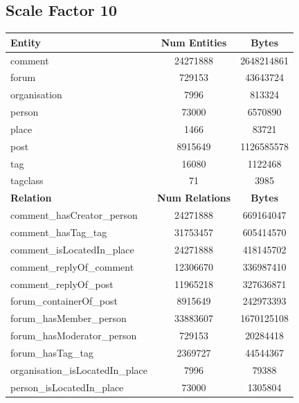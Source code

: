\subsection{Scale Factor 10}
\begin{table}[H]
    \centering
    \begin{tabular} {| l | c | c |}
        \hline
        \textbf{Entity} & \textbf{Num Entities} & \textbf{Bytes} \\
        \hline
        \hline
        comment & 24271888 & 2648214861 \\
        \hline
        forum & 729153 & 43643724 \\
        \hline
        organisation & 7996 & 813324 \\
        \hline
        person & 73000 & 6570890 \\
        \hline
        place & 1466 & 83721 \\
        \hline
        post & 8915649 & 1126585578 \\
        \hline
        tag & 16080 & 1122468 \\
        \hline
        tagclass & 71 & 3985 \\
        \hline
        \hline
        \textbf{Relation} & \textbf{Num Relations} & \textbf{Bytes} \\
        \hline
        \hline
        comment\_hasCreator\_person & 24271888 & 669164047 \\
        \hline
        comment\_hasTag\_tag & 31753457 & 605414570 \\
        \hline
        comment\_isLocatedIn\_place & 24271888 & 418145702 \\
        \hline
        comment\_replyOf\_comment & 12306670 & 336987410 \\
        \hline
        comment\_replyOf\_post & 11965218 & 327636871 \\
        \hline
        forum\_containerOf\_post & 8915649 & 242973393 \\
        \hline
        forum\_hasMember\_person & 33883607 & 1670125108 \\
        \hline
        forum\_hasModerator\_person & 729153 & 20284418 \\
        \hline
        forum\_hasTag\_tag & 2369727 & 44544367 \\
        \hline
        organisation\_isLocatedIn\_place & 7996 & 79388 \\
        \hline
        person\_isLocatedIn\_place & 73000 & 1305804 \\

\end{tabular}
\end{table}
